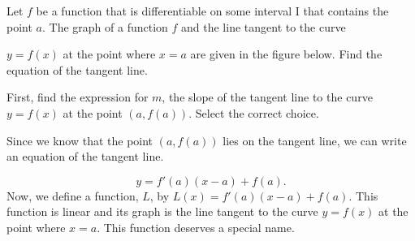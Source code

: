 \documentclass{ximera}
\begin{document}
\begin{example}
Let $f$ be a function that is differentiable on some interval I that contains the point $a$. The graph of a function $f$  and the line tangent to the curve

 $y=f(x)$ at the point where $x=a$ are given in the figure below.
Find the equation of the tangent line.






 \begin{image}
\end{image}




First, find the expression for $m$, the slope of the tangent line to the curve $y=f(x)$ at the point $(a,f(a))$.
 Select the correct choice.
 \begin{multipleChoice}

  \end{multipleChoice}
Since we know that the point $(a,f(a))$  lies on the tangent line,  we can write an equation of the tangent line. 

\[
y= f'(a)(x-a) +f(a).
\]
Now, we define a function, $L$,  by $L(x)= f'(a)(x-a) +f(a)$. This function is linear and its graph is the line tangent to the curve $y=f(x)$ at the point where $x=a$.
This function deserves a special name.
\end{example}
\end{document}
